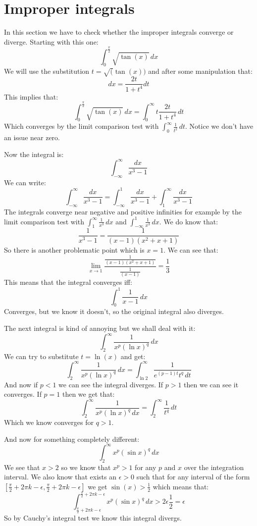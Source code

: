 \documentclass{article}
\theoremstyle{plain}
\begin{document}
	\section{Improper integrals}
	
	In this section we have to check whether the improper integrals converge
	or diverge. Starting with this one:
	\[
		\int_{0}^{\frac{\pi}{2}}{\sqrt{\tan(x)}\,dx}
	\]
	We will use the substitution $t = \sqrt(\tan(x))$ and after some
	manipulation that:
	\[
		dx = \frac{2t}{1+t^4}dt
	\]
	This implies that:
	\[
		\int_{0}^{\frac{\pi}{2}}{\sqrt{\tan(x)}\,dx} = 
		\int_{0}^{\infty}{t\frac{2t}{1+t^4}\,dt}
	\]
	Which converges by the limit comparison test with 
	$\int_{0}^{\infty}{\frac{1}{t^2}\,dt}$. Notice we don't have an issue
	near zero.
	
	\newpage
	
	Now the integral is:
	\[
		\int_{-\infty}^{\infty}{\frac{dx}{x^3-1}}
	\]
	We can write:
	\[
		\int_{-\infty}^{\infty}{\frac{dx}{x^3-1}} = 
		\int_{-\infty}^{1}{\frac{dx}{x^3-1}} + 
		\int_{1}^{\infty}{\frac{dx}{x^3-1}}
	\]
	The integrals converge near negative and positive infinities for example
	by the limit comparison test with $\int_{1}^{\infty}{\frac{1}{x^3}\,dx}$
	and $\int_{-\infty}^{1}{\frac{1}{x^3}\,dx}$. We do know that:
	\[
		\frac{1}{x^3-1} = 
		\frac{1}{(x-1)(x^2+x+1)}
	\]
	So there is another problematic point which is $x=1$. We can see that:
	\[
		\lim_{x\to 1}{\frac{\frac{1}{(x-1)(x^2+x+1)}}
		{\frac{1}{(x-1)}}} = \frac 13
	\]
	This means that the integral converges iff:
	\[
		\int_{0}^{1}{\frac{1}{x-1}\,dx}
	\]
	Converges, but we know it doesn't, so the original integral also diverges.
	
	\newpage
	
	The next integral is kind of annoying but we shall deal with it:
	\[
		\int_{2}^{\infty}{\frac{1}{x^p(\ln x)^q}\,dx}
	\]
	We can try to substitute $t = \ln(x)$ and get:
	\[
		\int_{2}^{\infty}{\frac{1}{x^p(\ln x)^q}\,dx} = 
		\int_{\ln 2}^{\infty}{\frac{1}{e^{(p-1)t}t^q\,dt}}
	\]
	And now if $p < 1$ we can see the integral diverges. If $p > 1$ then
	we can see it converges. If $p=1$ then we get that:
	\[
		\int_{2}^{\infty}{\frac{1}{x^p(\ln x)^q\,dx}} = 
		\int_{2}^{\infty}{\frac{1}{t^q}\,dt}
	\]
	Which we know converges for $q > 1$.
	
	\newpage
	
	And now for something completely different:
	\[
		\int_{2}^{\infty}{x^p(\sin x)^q\,dx}
	\]
	We see that $x > 2$ so we know that $x^p > 1$ for any $p$ and $x$ over
	the integration interval. We also know that exists an $\epsilon > 0$
	such that for any interval of the form
	$[\frac{\pi}{2} + 2\pi k - \epsilon, \frac{\pi}{2} + 2\pi k - \epsilon]$
	we get $\sin(x) > \frac 12$ which means that:
	\[
		\int_{\frac{\pi}{2} + 2\pi k - \epsilon}^
		{\frac{\pi}{2} + 2\pi k - \epsilon}{x^p(\sin x)^q\,dx} > 
		2\epsilon \frac {1}{2} = \epsilon
	\]
	So by Cauchy's integral test we know this integral divergs.
	
\end{document}

